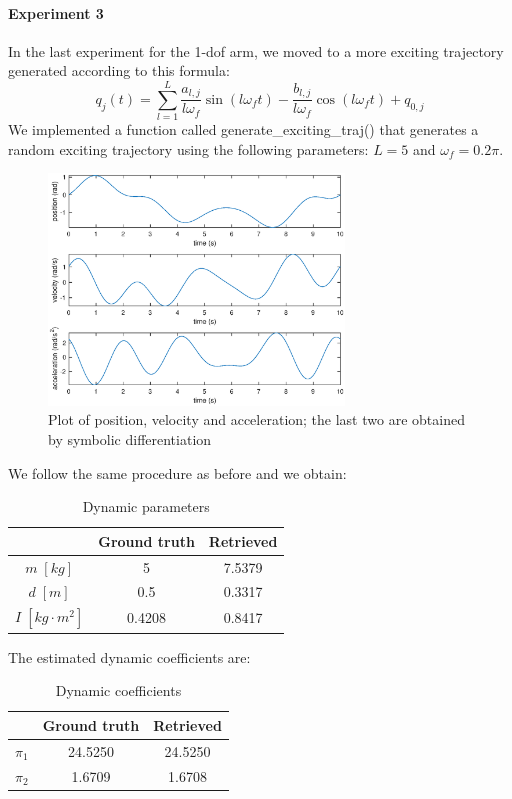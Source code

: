 \documentclass{article}
\begin{document}
\paragraph{Experiment 3} In the last experiment for the 1-dof arm, we moved to a more exciting trajectory generated according to this formula:
\[q_j(t) = \sum_{l=1}^{L}{\frac{ a_{l,j}}{ l\omega_f }\sin(l\omega_f t)-\frac{ b_{l,j}}{l\omega_f}\cos(l\omega_f t)+q_{0,j}}\]
We implemented a function called generate\_exciting\_traj() that generates a random exciting trajectory using the following parameters: $L = 5$ and $\omega_f = 0.2\pi$.

\begin{figure}[!htbp]
\centering
\includegraphics[width=0.7\textwidth]{images/1-dof/trajectory1.eps}
\caption{Plot of position, velocity and acceleration; the last two are obtained by symbolic differentiation}
\end{figure}
\FloatBarrier

We follow the same procedure as before and we obtain:

\begin{table}[!htbp]
\centering
\begin{tabular}{|c|cc|}
\hline
& Ground truth & Retrieved\\
\hline
$m\;[kg]$ & 5 & 7.5379\\ 
$d\;[m]$ & 0.5 & 0.3317\\
$I\;[kg\cdot m^2]$ & 0.4208 & 0.8417\\
\hline
\end{tabular}
\caption{Dynamic parameters}
\end{table}
\FloatBarrier

The estimated dynamic coefficients are:

\begin{table}[!htbp]
\centering
\begin{tabular}{|c|cc|}
\hline
& Ground truth & Retrieved\\
\hline
$\pi_1$ & 24.5250 & 24.5250\\ 
$\pi_2$ & 1.6709 & 1.6708\\
\hline
\end{tabular}
\caption{Dynamic coefficients}
\end{table}
\FloatBarrier
\end{document}
